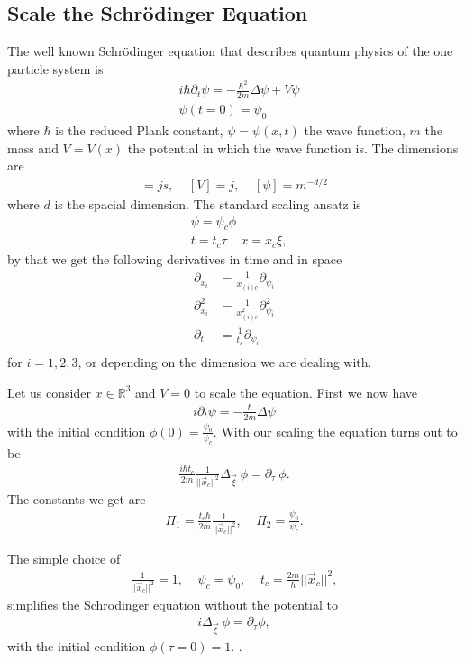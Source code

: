 \subsection{Scale the Schrödinger Equation}
The well known Schrödinger equation that describes quantum physics of the one
particle system is
\begin{align}
    &i\hbar \partial_t\psi = -\frac{\hbar^2}{2m}\Delta \psi + V\psi \nonumber\\
    &\psi(t=0) =\psi_0
\end{align}
where $\hbar$ is the reduced Plank constant, $\psi=\psi(x, t)$ the wave function,
$m$ the mass and $V = V(x)$ the potential in which the wave function is. The
dimensions are
\begin{align}
    [\hbar] = js, \;\;\;\; [V] = j,  \;\;\;\; [\psi]= m^{-d/2}
\end{align}
where $d$ is the spacial dimension. The standard scaling ansatz is
\begin{align}
    &\psi = \psi_c \phi \\
    &t = t_c \tau \;\;\;\; x = x_c \xi,
\end{align}
by that we get the following derivatives in time and in space
\begin{align}
    \partial_{x_i} &=\frac{1}{x_{(i)c}} \partial_{\psi_i} \\
    \partial^2_{x_i} &=\frac{1}{x_{(i)c}^2} \partial_{\psi_i}^2\\
    \partial_{t} &=\frac{1}{t_c} \partial_{\psi_i} \\
\end{align}
for $i = 1, 2, 3$, or depending on the dimension we are dealing with.

Let us consider $x\in \mathbb{R}^3$ and $V = 0$ to scale the equation. First
we now have
\begin{align}
    i \partial_t\psi = -\frac{\hbar}{2m}\Delta \psi
\end{align}
with the initial condition $\phi(0) = \frac{\psi_0}{\psi_c}$. With our scaling the equation turns out to be
\begin{align}
    \frac{i\hbar t_c}{2m}\frac{1}{||\vec{x}_c||^2}\Delta_{\vec{\xi}}\ \phi =
    \partial_\tau\ \phi.
\end{align}
The constants we get are
\begin{align}
    \Pi_1 = \frac{t_c\hbar}{2m}\frac{1}{||\vec{x}_c||^2}, \;\;\;\; \Pi_2 =
    \frac{\psi_0}{\psi_c}.
\end{align}

The simple choice of
\begin{align}
    \frac{1}{||\vec{x}_c||^2} = 1, \;\;\;\; \psi_c = \psi_0, \;\;\;\; t_c =
    \frac{2m}{\hbar}||\vec{x}_c||^2,
\end{align}
simplifies the Schrodinger equation without the potential to
\begin{align}
    i\Delta_{\vec{\xi}}\ \phi = \partial_\tau \phi,
\end{align}
with the initial condition $\phi(\tau=0) = 1$.
.


